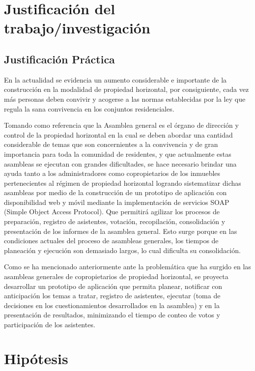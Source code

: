 \section{Justificación del trabajo/investigación}

\subsection{Justificación Práctica}

En la actualidad se evidencia un aumento considerable e importante de la construcción en la modalidad de propiedad horizontal, por consiguiente, cada vez más personas deben convivir y acogerse a las normas establecidas por la ley que regula la sana convivencia en los conjuntos residenciales. 

Tomando como referencia que la Asamblea general es el órgano de dirección y control de la propiedad horizontal en la cual se deben abordar una cantidad considerable de temas que son concernientes a la convivencia y de gran importancia para toda la comunidad de residentes,  y que actualmente estas asambleas se ejecutan con grandes dificultades, se hace necesario brindar una ayuda tanto a los administradores como copropietarios de los inmuebles pertenecientes al régimen de propiedad horizontal logrando sistematizar dichas asambleas por medio de la construcción de un prototipo de aplicación con disponibilidad web y móvil mediante la implementación de servicios SOAP (Simple Object Access Protocol).  Que permitirá agilizar los procesos de preparación, registro de asistentes, votación, recopilación, consolidación y presentación de los informes de la asamblea general. Esto surge porque en las condiciones actuales del proceso de asambleas generales, los tiempos de planeación y ejecución son demasiado largos, lo cual dificulta su consolidación.

Como se ha mencionado anteriormente ante la problemática que ha surgido en las asambleas generales de copropietarios de propiedad horizontal, se proyecta desarrollar un prototipo de aplicación que permita planear, notificar con anticipación los temas a tratar, registro de asistentes, ejecutar (toma de decisiones en los cuestionamientos desarrollados en la asamblea) y en la presentación de resultados, minimizando el tiempo de conteo de votos y participación de los asistentes.

\section{Hipótesis}


